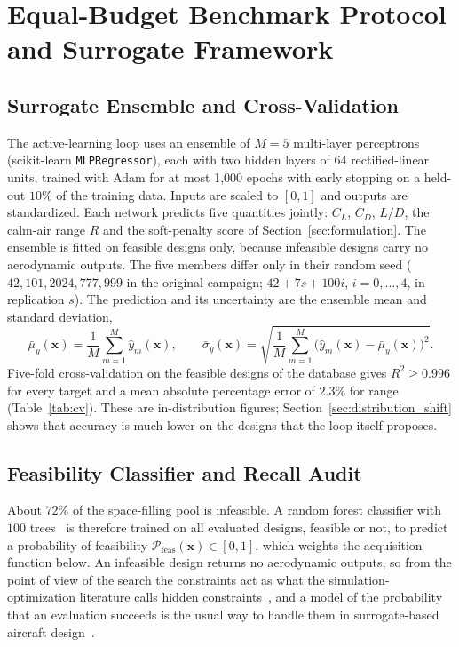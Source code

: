\section{Equal-Budget Benchmark Protocol and Surrogate Framework}
\label{sec:protocol}

\subsection{Surrogate Ensemble and Cross-Validation}
The active-learning loop uses an ensemble of $M = 5$ multi-layer perceptrons (scikit-learn \texttt{MLPRegressor}), each with two hidden layers of 64 rectified-linear units, trained with Adam for at most 1{,}000 epochs with early stopping on a held-out $10\%$ of the training data. Inputs are scaled to $[0, 1]$ and outputs are standardized. Each network predicts five quantities jointly: $C_L$, $C_D$, $L/D$, the calm-air range $R$ and the soft-penalty score of Section~\ref{sec:formulation}. The ensemble is fitted on feasible designs only, because infeasible designs carry no aerodynamic outputs. The five members differ only in their random seed ($42, 101, 2024, 777, 999$ in the original campaign; $42 + 7s + 100i$, $i = 0,\ldots,4$, in replication $s$). The prediction and its uncertainty are the ensemble mean and standard deviation,
\begin{equation}
\bar{\mu}_y(\mathbf{x}) = \frac{1}{M} \sum_{m=1}^M \hat{y}_m(\mathbf{x}), \qquad \bar{\sigma}_y(\mathbf{x}) = \sqrt{\frac{1}{M} \sum_{m=1}^M \big(\hat{y}_m(\mathbf{x}) - \bar{\mu}_y(\mathbf{x})\big)^2} .
\end{equation}
Five-fold cross-validation on the feasible designs of the database gives $R^2 \ge 0.996$ for every target and a mean absolute percentage error of $2.3\%$ for range (Table~\ref{tab:cv}). These are in-distribution figures; Section~\ref{sec:distribution_shift} shows that accuracy is much lower on the designs that the loop itself proposes.

\subsection{Feasibility Classifier and Recall Audit}
\label{sec:classifier_audit}
About $72\%$ of the space-filling pool is infeasible. A random forest classifier with $100$ trees~\cite{breiman2001random} is therefore trained on all evaluated designs, feasible or not, to predict a probability of feasibility $\mathcal{P}_{\mathrm{feas}}(\mathbf{x}) \in [0, 1]$, which weights the acquisition function below. An infeasible design returns no aerodynamic outputs, so from the point of view of the search the constraints act as what the simulation-optimization literature calls hidden constraints~\cite{ledigabel2015taxonomy}, and a model of the probability that an evaluation succeeds is the usual way to handle them in surrogate-based aircraft design~\cite{bussemaker2024hidden}.


